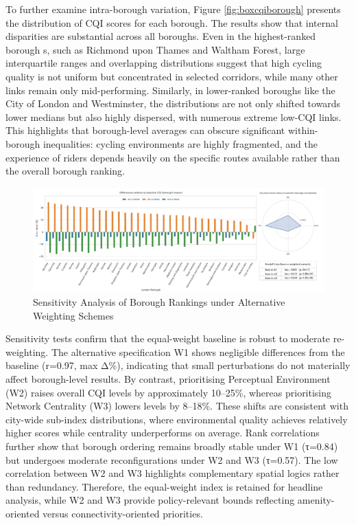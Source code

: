 \documentclass[
  12pt,
  oneside]{book}
\begin{document}
To further examine intra-borough variation, Figure \ref{fig:boxcqiborough} presents the distribution of CQI scores for each borough. The results show that internal disparities are substantial across all boroughs. Even in the highest-ranked borough s, such as Richmond upon Thames and Waltham Forest, large interquartile ranges and overlapping distributions suggest that high cycling quality is not uniform but concentrated in selected corridors, while many other links remain only mid-performing. Similarly, in lower-ranked boroughs like the City of London and Westminster, the distributions are not only shifted towards lower medians but also highly dispersed, with numerous extreme low-CQI links. This highlights that borough-level averages can obscure significant within-borough inequalities: cycling environments are highly fragmented, and the experience of riders depends heavily on the specific routes available rather than the overall borough ranking.

\begin{figure}

{\centering \includegraphics[width=1\linewidth]{general_images/cqi_robustness_delta_bar} 

}

\caption{Sensitivity Analysis of Borough Rankings under Alternative Weighting Schemes}\label{fig:cqirobustnessdeltabar}
\end{figure}

Sensitivity tests confirm that the equal-weight baseline is robust to moderate re-weighting. The alternative specification W1 shows negligible differences from the baseline (r=0.97, max \textbar Δ\%), indicating that small perturbations do not materially affect borough-level results. By contrast, prioritising Perceptual Environment (W2) raises overall CQI levels by approximately 10--25\%, whereas prioritising Network Centrality (W3) lowers levels by 8--18\%. These shifts are consistent with city-wide sub-index distributions, where environmental quality achieves relatively higher scores while centrality underperforms on average. Rank correlations further show that borough ordering remains broadly stable under W1 (τ=0.84) but undergoes moderate reconfigurations under W2 and W3 (τ=0.57). The low correlation between W2 and W3 highlights complementary spatial logics rather than redundancy. Therefore, the equal-weight index is retained for headline analysis, while W2 and W3 provide policy-relevant bounds reflecting amenity-oriented versus connectivity-oriented priorities.
\end{document}
